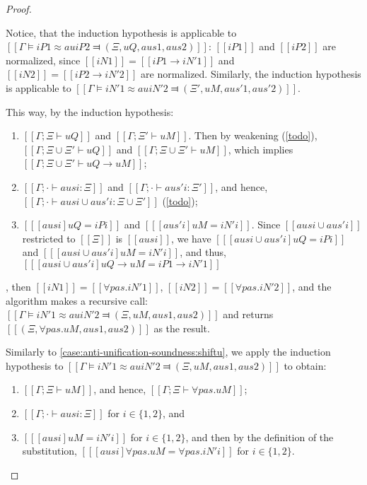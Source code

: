 \begin{proof}
\begin{caseof}
                Notice, that the induction hypothesis is applicable to 
                $[[Γ ⊨ iP1 ≈au iP2 ⫤ (Ξ, uQ, aus1, aus2)]]$:
                $[[iP1]]$ and $[[iP2]]$ are normalized, since $[[iN1]] = [[iP1 → iN'1]]$
                and $[[iN2]] = [[iP2 → iN'2]]$ are normalized.
                Similarly, the induction hypothesis is applicable to
                $[[Γ ⊨ iN'1 ≈au iN'2 ⫤ (Ξ', uM, aus'1, aus'2)]]$.

                This way, by the induction hypothesis:
                \begin{enumerate}
                    \item $[[Γ ; Ξ ⊢ uQ]]$ and $[[Γ ; Ξ' ⊢ uM]]$. 
                    Then by weakening (\cref{todo}), $[[Γ ; Ξ ∪ Ξ' ⊢ uQ]]$ and 
                    $[[Γ ; Ξ ∪ Ξ' ⊢ uM]]$, which implies $[[Γ ; Ξ ∪ Ξ' ⊢ uQ → uM]]$;

                    \item $[[Γ ; · ⊢ ausi : Ξ]]$ and $[[Γ ; · ⊢ aus'i : Ξ']]$, 
                           and hence, $[[Γ ; · ⊢ ausi ∪ aus'i : Ξ ∪ Ξ']]$ (\cref{todo});

                    \item $[[ [ausi] uQ = iPi ]]$ and $[[ [aus'i] uM = iN'i ]]$.
                    Since $[[ausi ∪ aus'i]]$ restricted to $[[Ξ]]$ is $[[ausi]]$,
                    we have $[[ [ausi ∪ aus'i] uQ = iPi ]]$ and 
                    $[[ [ausi ∪ aus'i] uM = iN'i ]]$, and thus, 
                    $[[ [ausi ∪ aus'i] uQ → uM = iP1 → iN'1 ]]$
                \end{enumerate}

        \item {}, then $[[iN1]] = [[∀pas.iN'1]]$,
                $[[iN2]] = [[∀pas.iN'2]]$, and the algorithm makes a recursive call:
                $[[Γ ⊨ iN'1 ≈au iN'2 ⫤ (Ξ, uM, aus1, aus2)]]$ and
                returns $[[(Ξ, ∀pas.uM, aus1, aus2)]]$ as the result.

                Similarly to \cref{case:anti-unification-soundness:shiftu}, 
                we apply the induction hypothesis to
                $[[Γ ⊨ iN'1 ≈au iN'2 ⫤ (Ξ, uM, aus1, aus2)]]$ to obtain:
                \begin{enumerate}
                    \item $[[Γ; Ξ ⊢ uM]]$, and hence, $[[Γ ; Ξ ⊢ ∀pas.uM]]$;
                    \item $[[Γ; · ⊢ ausi : Ξ]]$ for $i \in \{1,2\}$, and
                    \item $[[ [ausi] uM = iN'i ]]$ for $i \in \{1,2\}$,
                        and then by the definition of the substitution,
                        $[[ [ausi] ∀pas.uM = ∀pas.iN'i ]]$ for $i \in \{1,2\}$. 
                \end{enumerate}


\end{caseof}
\end{proof}
